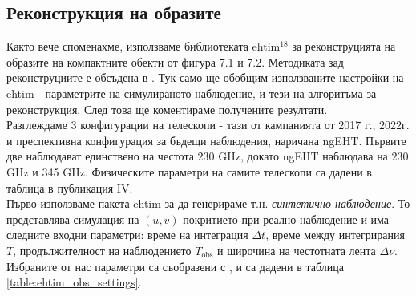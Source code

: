\subsection{Реконструкция на образите}

Както вече споменахме, използваме библиотеката ehtim$^{18}$ за реконструцията на образите на компактните обекти от фигура 7.1 и 7.2. Методиката зад реконструциите е обсъдена в \cite{EHTIM}. Тук само ще обобщим използваните настройки на ehtim - параметрите на симулираното наблюдение, и тези на алгоритъма за реконструкция. След това ще коментираме получените резултати.\\

Разглеждаме 3 конфигурации на телескопи - тази от кампанията от 2017 г., 2022г. и преспективна конфигурация за бъдещи наблюдения, наричана ngEHT. Първите две наблюдават единствено на честота $230$ GHz, докато ngEHT наблюдава на $230$ GHz и 345 GHz. Физическите параметри на самите телескопи са дадени в таблица в публикация IV. \\

Първо използваме пакета ehtim за да генерираме т.н. \emph{синтетично наблюдение}. То представлява симулация на $(u,v)$ покритието при реално наблюдение и има следните входни параметри: време на интеграция $\Delta t$, време между интегрирания $T$, продължителност на наблюдението $T_\text{obs}$ и широчина на честотната лента $\Delta\nu$. Избраните от нас параметри са съобразени с \cite{EHTIM}, и са дадени в таблица \ref{table:ehtim_obs_settings}.\\

